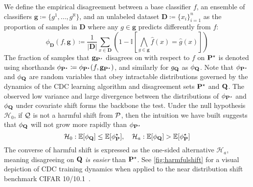 We define the empirical disagreement between a base classifier $f$, an ensemble of classifiers $\mathbf{g}\coloneqq \{g^1,\dots,g^\aleph \}$, and an unlabeled dataset $\mathbf{D}\coloneqq \{x_i\}_{i=1}^n$ as the proportion of samples in $\mathbf{D}$
where any $g\in \mathbf{g}$ predicts differently from $f$:
\begin{equation}
    \phi_{\mathbf{D}}(f,\mathbf{g}) \coloneqq \frac{1}{|\mathbf{D}|} \sum_{x\in \mathbf{D}} \left(1-\mathbb{I}\left[\bigwedge\limits_{g\in \mathbf{g}} \hat{f}(x)=\hat{g}(x)\right]\right)
\end{equation}
The fraction of samples that $\mathbf{g}_{\mathbf{P}^\star}$ disagrees on with respect to $f$ on $\mathbf{P}^\star$ is denoted using shorthands $\phi_{\mathbf{P}^\star}\coloneqq \phi_{\mathbf{P}^\star}(f, \mathbf{g}_{\mathbf{P}^\star})$,
and similarly for $g_{\mathbf{Q}}$ as $\phi_{\mathbf{Q}}$.
Note that $\phi_{\mathbf{P}^\star}$ and $\phi_{\mathbf{Q}}$ are random variables that obey intractable distributions governed by the dynamics of the CDC learning algorithm and disagreement sets $\mathbf{P}^\star$ and $\mathbf{Q}$.
The observed low variance and large divergence between the distributions of $\phi_{\mathbf{P}^\star}$ and $\phi_{\mathbf{Q}}$ under covariate shift forms the backbone the \method test.
Under the null hypothesis $\mathcal{H}_0$, if $\mathcal{Q}$ is not a harmful shift from $\mathcal{P}$,
then the intuition we have built suggests that $\phi_{\mathbf{Q}}$ will not grow more rapidly than $\phi_{\mathbf{P}^\star}$
\begin{equation}
    \mathcal{H}_0: \mathbb{E}[\phi_{\mathbf{Q}}] \leq \mathbb{E}[\phi_{\mathbf{P}}^\star], \quad  \mathcal{H}_a: \mathbb{E}[\phi_{\mathbf{Q}}] > \mathbb{E}[\phi_{\mathbf{P}}^\star]
    \label{eq:harmfulshifttest}
\end{equation}
The converse of harmful shift is expressed as the one-sided alternative $\mathcal{H}_a$, meaning disagreeing on $\mathbf{Q}$ \textit{is easier} than $\mathbf{P}^\star$.
See \autoref{fig:harmfulshift} for a visual depiction of CDC training dynamics when applied to the near distribution shift benchmark CIFAR 10/10.1~\citep{cifar101}.

